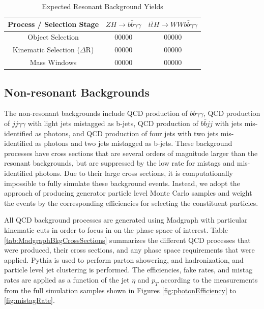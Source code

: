 \documentclass{cmspaper}
\begin{document}
\begin{table}[!ht]
\begin{center} 
\begin{tabular}{|c|c|c|}
\hline
Process / Selection Stage       &  $ZH \rightarrow b\bar{b}\gamma\gamma$ &  $t\bar{t}H \rightarrow W W b \bar{b}\gamma\gamma$    \\  \hline
Object Selection                &  00000                                 &  00000                                                \\ 
Kinematic Selection ($\Delta$R) &  00000                                 &  00000                                                \\ 
Mass Windows                    &  00000                                 &  00000                                                \\ \hline

\end{tabular}
\caption{Expected Resonant Background Yields }
\label{tab:resonantBkgEventYields}
\end{center}
\end{table}





\subsection{Non-resonant Backgrounds}
The non-resonant backgrounds include QCD production of $b \bar{b} \gamma\gamma$, QCD production
of $jj \gamma\gamma$ with light jets mistagged as b-jets, QCD production of $b \bar{b} jj$ with
jets mis-identified as photons, and QCD production of four jets with two jets mis-identified 
as photons and two jets mistagged as b-jets. These background processes have cross sections
that are several orders of magnitude larger than the resonant backgrounds, but are suppressed
by the low rate for mistags and mis-identified photons. Due to their large cross sections, 
it is computationally impossible to fully simulate these background events. Instead, we adopt the
approach of producing generator particle level Monte Carlo samples and weight the events by the
corresponding efficiencies for selecting the constituent particles.

All QCD background processes are generated using Madgraph \cite{madgraph} with particular kinematic
cuts in order to focus in on the phase space of interest. Table \ref{tab:MadgraphBkgCrossSections} 
summarizes the different QCD processes that were produced, their cross sections, 
and any phase space requirements that were applied. Pythia is used to perform parton showering,
and hadronization, and particle level jet clustering is performed. The efficiencies, fake rates, and
mistag rates are applied as a function of the jet $\eta$ and $p_{T}$ according to the measurements
from the full simulation samples shown in Figures \ref{fig:photonEfficiency} to \ref{fig:mistagRate}.
\end{document}
